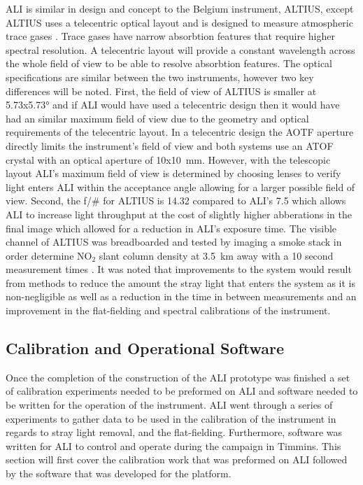 \documentclass[12pt]{article}
\begin{document}
ALI is similar in design and concept to the Belgium instrument, ALTIUS, except ALTIUS uses a telecentric optical layout and is designed to measure atmospheric trace gases \citep{Dekemper2012}. Trace gases have narrow absorbtion features that require higher spectral resolution. A telecentric layout will provide a constant wavelength across the whole field of view to be able to resolve absorbtion features. The optical specifications are similar between the two instruments, however two key differences will be noted. First, the field of view of ALTIUS is smaller at 5.73x5.73\si{\degree} and if ALI would have used a telecentric design then it would have had an similar maximum field of view due to the geometry and optical requirements of the telecentric layout. In a telecentric design the AOTF aperture directly limits the instrument's field of view and both systems use an ATOF crystal with an optical aperture of 10x10~mm. However, with the telescopic layout ALI's maximum field of view is determined by choosing lenses to verify light enters ALI within the acceptance angle allowing for a larger possible field of view. Second, the f/\# for ALTIUS is 14.32 compared to ALI's 7.5 which allows ALI to increase light throughput at the cost of slightly higher abberations in the final image which allowed for a reduction in ALI's exposure time. The visible channel of ALTIUS was breadboarded and tested by imaging a smoke stack in order determine NO$_{2}$ slant column density at 3.5~km away with a 10 second measurement times \citep{Dekemper2012}. It was noted that improvements to the system would result from methods to reduce the amount the stray light that enters the system as it is non-negligible as well as a reduction in the time in between measurements and an improvement in the flat-fielding and spectral calibrations of the instrument.

\subsection{Calibration and Operational Software}
\label{sec:Calibration}

Once the completion of the construction of the ALI prototype was finished a set of calibration experiments needed to be preformed on ALI and software needed to be written for the operation of the instrument. ALI went through a series of experiments to gather data to be used in the calibration of the instrument in regards to stray light removal, and the flat-fielding. Furthermore, software was written for ALI to control and operate during the campaign in Timmins. This section will first cover the calibration work that was preformed on ALI followed by the software that was developed for the platform.
\end{document}
